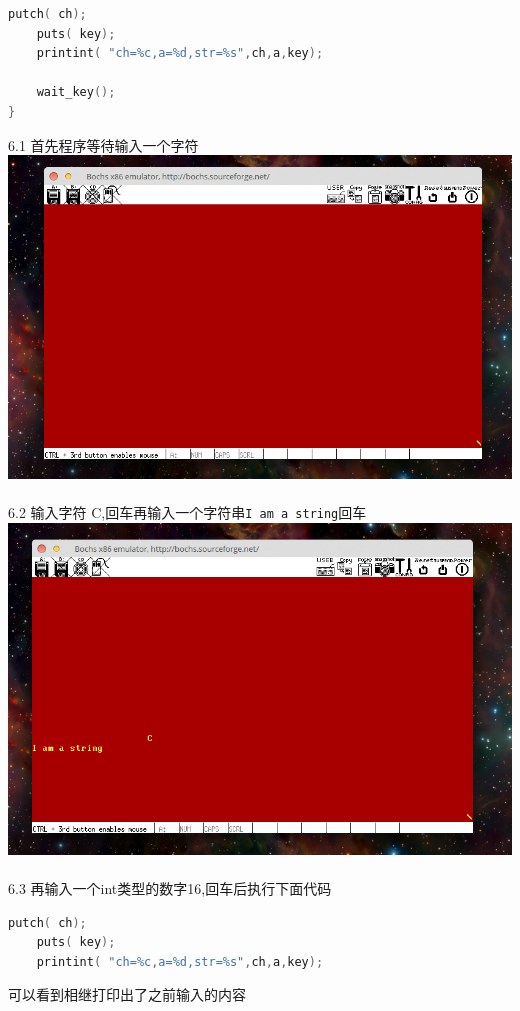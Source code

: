 \documentclass[a4paper]{article}
\begin{document}
{{{\begin{lstlisting}[language={C}]
	putch( ch);
	puts( key);
	printint( "ch=%c,a=%d,str=%s",ch,a,key);

	wait_key();
}

\end{lstlisting}}
6.1 首先程序等待输入一个字符
{\center\includegraphics[scale=0.4]{Illustrations/usr1_wait.png}}\\\\
6.2 输入字符 C,回车再输入一个字符串\verb|I am a string|回车
{\center\includegraphics[scale=0.4]{Illustrations/usr1_inputstr.png}}\\\\
6.3 再输入一个int类型的数字16,回车后执行下面代码\\
{\scriptsize\begin{lstlisting}[language={C}]
	putch( ch);
	puts( key);
	printint( "ch=%c,a=%d,str=%s",ch,a,key);
\end{lstlisting}}
可以看到相继打印出了之前输入的内容
}}
\end{document}
